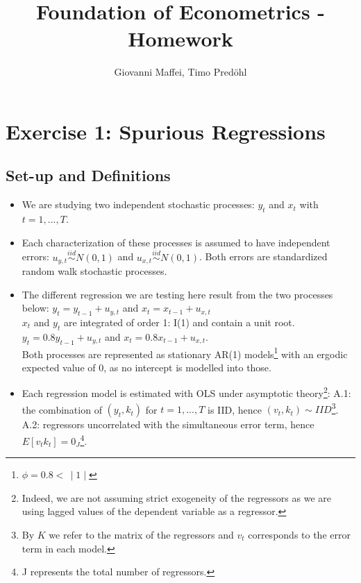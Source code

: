 \documentclass[12pt]{article}
\title{Foundation of Econometrics - Homework}
\author{Giovanni Maffei, Timo Predöhl}
\newcommand{\replacedTP}[2]{\replaced[id=tp]{#2}{#1}}
\begin{document}
	
	\maketitle
	
	\begin{spacing}{1}
		\tableofcontents		
	\end{spacing}
	
	\pagebreak

	\section{Exercise 1: Spurious Regressions}
	\subsection{Set-up and Definitions}
	\begin{itemize}
		\item We are studying two independent stochastic processes: $y_t$ and $x_t$  with $t=1,...,T$.
		\item Each characterization of these processes is assumed to have independent errors: $u_{y,t} \overset{iid}{\sim}N(0,1)$ and $u_{x,t} \overset{iid}{\sim}N(0,1)$.
			\subitem Both errors are standardized random walk stochastic processes.
		\item The different regression \replacedTP{modeles}{models} we are testing here result from the two processes below:
			\subitem $y_t = y_{t-1} + u_{y,t}$ and $x_t = x_{t-1} + u_{x,t}$ \vspace{0.5em}\\ 
			$x_t$ and $y_t$ are integrated of order 1: I(1) and contain a unit root.
			\subitem $y_t = 0.8y_{t-1} + u_{y,t}$ and $x_t = 0.8x_{t-1} + u_{x,t}$.\vspace{0.5em}\\
			Both processes are represented as stationary AR(1) models\footnote{$\phi = 0.8 < \,\mid1\mid$} with an ergodic expected value of 0, as no intercept is modelled into those.
		\item Each regression model is estimated with OLS under asymptotic theory\footnote{Indeed, we are not assuming strict exogeneity of the regressors as we are using lagged values of the dependent variable as a regressor.}:
			\subitem A.1: the combination of $(y_t, k_t)$ for $t = 1,...,T$ is IID, hence $(v_t, k_t)\sim IID$\footnote{By $K$ we refer to the matrix of the regressors and $v_t$ corresponds to the error term in each model.}.
			\subitem A.2: regressors uncorrelated with the simultaneous error term, hence $E[v_{t}k_{t}]=0_J$\footnote{J represents the total number of regressors.}.

\end{itemize}
\end{document}
